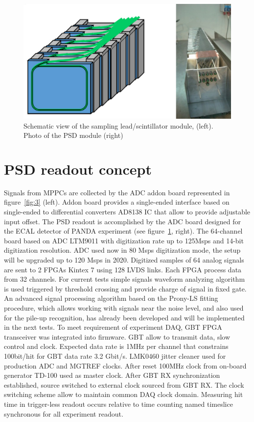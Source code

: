 \documentclass[a4paper,11pt]{article}
\begin{document}
\begin{figure}[htbp]
\centering 
\includegraphics[width=.45\textwidth]{PSD_module.png}
\caption{\label{fig:2} Schematic view of the sampling lead/scintillator module, (left). Photo of the PSD module (right)}
\end{figure}



\section{PSD readout concept}
Signals from MPPCs are collected by the ADC addon board represented in figure~\ref{fig:3} (left). Addon board provides a single-ended interface based on single-ended to differential converters AD8138 IC that allow to provide adjustable input offset. The PSD readout is accomplished by the ADC board designed for the ECAL detector of PANDA experiment \cite{3} (see figure~\ref{fig:2}, right). The 64-channel board based on ADC LTM9011 with digitization rate up to 125Msps and 14-bit digitization resolution. ADC used now in 80 Msps digitization mode, the setup will be upgraded up to 120 Msps in 2020. 
Digitized samples of 64 analog signals are sent to 2 FPGAs Kintex 7 using 128 LVDS links. Each FPGA process data from 32 channels. For current tests simple signals waveform analyzing algorithm is used triggered by threshold crossing and provide charge of signal in fixed gate. An advanced signal processing algorithm based on the Prony-LS fitting procedure, which allows working with signals near the noise level, and also used for the pile-up recognition, has already been developed and will be implemented in the next tests.
To meet requirement of experiment DAQ, GBT FPGA transceiver was integrated into firmware. GBT allow to transmit data, slow control and clock. Expected data rate is 1MHz per channel that constrains 100bit/hit for GBT data rate 3.2 Gbit/s. 
LMK0460 jitter cleaner used for production ADC and MGTREF clocks. After reset 100MHz clock from on-board generator TD-100 used as master clock. After GBT RX synchronization established, source switched to external clock sourced from GBT RX. The clock switching scheme allow to maintain common DAQ clock domain. Measuring hit time in trigger-less readout occurs relative to time counting named timeslice synchronous for all experiment readout.
\end{document}
